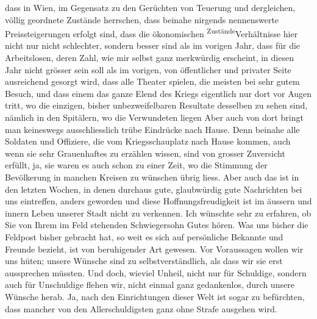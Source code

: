 \begin{ledgroupsized}[t]{13cm}
               dass in Wien, im Gegensatz zu den Gerüchten von
               Teuerung und dergleichen, völlig geordnete Zustände herrschen, dass beinahe nirgends
               nennenswerte Preissteigerungen erfolgt sind, dass die ökonomischen \substVorne{}\textsuperscript{Zustände}{\allowbreak}\substDazwischen{}Verhältnisse\substHinten{} hier nicht nur nicht schlechter, sondern besser sind als im vorigen Jahr,
               dass für die Arbeitslosen, deren Zahl, wie mir selbst ganz merkwürdig erscheint, in
               diesen Jahr nicht grösser sein soll als im vorigen, von öffentlicher und privater
               Seite ausreichend {\pb}gesorgt wird, dass alle Theater
               spielen, die meisten bei sehr gutem Besuch, und dass einem das ganze Elend des Kriegs
               eigentlich nur dort vor Augen tritt, wo die einzigen, bisher unbezweifelbaren
               Resultate desselben zu sehen sind, nämlich in den Spitälern, wo die Verwundeten
                  liegen{\dotstwo} Aber auch von dort bringt man keineswegs
               ausschliesslich trübe Eindrücke nach Hause. Denn beinahe alle Soldaten und Offiziere,
               die vom Kriegsschauplatz nach Hause kommen, auch wenn sie sehr Grauenhaftes zu
               erzählen wissen, sind von grosser Zuversicht erfüllt, ja, sie waren es auch schon zu
               einer Zeit, wo die Stimmung der Bevölkerung in manchen Kreisen zu wünschen übrig
               liess. Aber auch das ist in den letzten Wochen, in denen durchaus gute, glaubwürdig
               gute Nachrichten bei uns eintreffen, anders geworden und diese Hoffnungsfreudigkeit
               ist im äussern und innern Leben unserer Stadt nicht zu verkennen.\pend
           \pstart
           Ich wünschte sehr zu erfahren, ob {\pb}Sie von Ihrem
               im Feld stehenden Schwiegersohn Gutes hören. Was uns bisher die Feldpost bisher
               gebracht hat, so weit es sich auf persönliche Bekannte und Freunde bezieht, ist von
               beruhigender Art gewesen.\pend
           \pstart
           Vor Voraussagen wollen wir uns hüten; unsere Wünsche sind zu selbstverständlich, als
               dass wir sie erst aussprechen müssten. Und doch, wieviel Unheil, nicht nur für
               Schuldige, sondern auch für Unschuldige flehen wir, nicht einmal ganz gedankenlos,
               durch unsere Wünsche herab. Ja, nach den Einrichtungen dieser Welt ist sogar zu
               befürchten, dass mancher von den Allerschuldigsten ganz ohne Strafe ausgehen wird.

\end{ledgroupsized}
